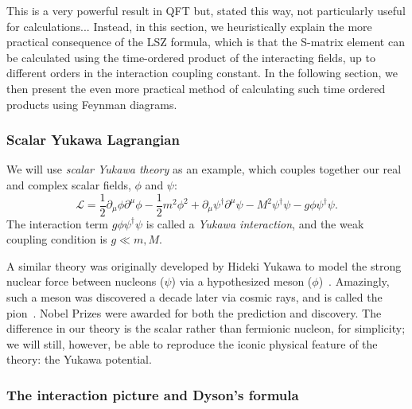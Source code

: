 This is a very powerful result in QFT but, stated this way, not particularly useful for calculations... 
Instead, in this section, we heuristically explain the more practical consequence of the LSZ formula, which is that the S-matrix element can be calculated using the time-ordered product of the interacting fields, up to different orders in the interaction coupling constant.
In the following section, we then present the even more practical method of calculating such time ordered products using Feynman diagrams.


\subsubsection{Scalar Yukawa Lagrangian}

We will use \textit{scalar Yukawa theory} as an example, which couples together our real and complex scalar fields, $\phi$ and $\psi$:
\begin{equation}
	\label{eq:01_qft_interactions_yukawa}
	\mathcal L = \frac{1}{2}\partial_\mu\phi\partial^\mu\phi - \frac{1}{2}m^2\phi^2 + \partial_\mu\psi^\dagger\partial^\mu\psi - M^2\psi^\dagger\psi - g\phi\psi^\dagger\psi.
\end{equation}
The interaction term $g\phi\psi^\dagger\psi$ is called a \textit{Yukawa interaction}, and the weak coupling condition is $g \ll m, M$.

A similar theory was originally developed by Hideki Yukawa to model the strong nuclear force between nucleons ($\psi$) via a hypothesized meson ($\phi$)~\cite{Yukawa:1935xg}. 
Amazingly, such a meson was discovered a decade later via cosmic rays, and is called the pion~\cite{Lattes:1947mw}.
Nobel Prizes were awarded for both the prediction and discovery.
The difference in our theory is the scalar rather than fermionic nucleon, for simplicity; we will still, however, be able to reproduce the iconic physical feature of the theory: the Yukawa potential.


\subsubsection{The interaction picture and Dyson's formula}

